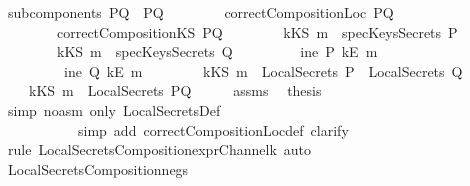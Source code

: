 \begin{isabellebody}
\ {\isachardoublequoteopen}subcomponents\ PQ\ {\isacharequal}\ {\isacharbraceleft}P{\isacharcomma}Q{\isacharbraceright}{\isachardoublequoteclose}\isanewline
\ \ \ \ \ \ \ \ {\isachardoublequoteopen}correctCompositionLoc\ PQ{\isachardoublequoteclose}\isanewline
\ \ \ \ \ \ \ \ {\isachardoublequoteopen}correctCompositionKS\ PQ{\isachardoublequoteclose}\isanewline
\ \ \ \ \ \ \ \ {\isachardoublequoteopen}{\isacharparenleft}kKS\ m{\isacharparenright}\ {\isasymnotin}\ specKeysSecrets\ P{\isachardoublequoteclose}\isanewline
\ \ \ \ \ \ \ \ {\isachardoublequoteopen}{\isacharparenleft}kKS\ m{\isacharparenright}\ {\isasymnotin}\ specKeysSecrets\ Q{\isachardoublequoteclose}\isanewline
\ \ \ \ \ \ \ \ {\isachardoublequoteopen}{\isasymnot}\ ine\ P\ {\isacharparenleft}kE\ m{\isacharparenright}{\isachardoublequoteclose}\isanewline
\ \ \ \ \ \ \ \ {\isachardoublequoteopen}{\isasymnot}\ ine\ Q\ {\isacharparenleft}kE\ m{\isacharparenright}{\isachardoublequoteclose}\isanewline
\ \ \ \ \ \ \ \ {\isachardoublequoteopen}{\isacharparenleft}kKS\ m{\isacharparenright}\ {\isasymnotin}\ {\isacharparenleft}{\isacharparenleft}LocalSecrets\ P{\isacharparenright}\ {\isasymunion}\ {\isacharparenleft}LocalSecrets\ Q{\isacharparenright}{\isacharparenright}{\isachardoublequoteclose}\isanewline
{}\ \ \ \ {\isachardoublequoteopen}{\isacharparenleft}kKS\ m{\isacharparenright}\ {\isasymnotin}\ {\isacharparenleft}LocalSecrets\ PQ{\isacharparenright}{\isachardoublequoteclose}\isanewline
%
\isadelimproof
%
\endisadelimproof
%
\isatagproof
{}\isamarkupfalse%
\ {\isacharminus}\isanewline
\ \ \isamarkupfalse%
\ assms\ \isamarkupfalse%
\ {\isacharquery}thesis\ \isanewline
\ \ \ \ \isamarkupfalse%
\ {\isacharparenleft}simp\ {\isacharparenleft}no{\isacharunderscore}asm{\isacharparenright}\ only{\isacharcolon}\ LocalSecretsDef{\isacharcomma}\ \isanewline
\ \ \ \ \ \ \ \ \ \ \ simp\ add{\isacharcolon}\ correctCompositionLoc{\isacharunderscore}def{\isacharcomma}\ clarify{\isacharparenright}\isanewline
\ \ \ \ \isamarkupfalse%
\ {\isacharparenleft}rule\ LocalSecretsComposition{\isacharunderscore}exprChannel{\isacharunderscore}k{\isacharcomma}\ auto{\isacharparenright}\isanewline
{}\isamarkupfalse%
%
\endisatagproof
{\isafoldproof}%
%
\isadelimproof
\ \ \isanewline
%
\endisadelimproof
\isanewline
{}\isamarkupfalse%
\ LocalSecretsComposition{\isacharunderscore}neg{\isacharunderscore}s{\isacharcolon}\isanewline

\end{isabellebody}
